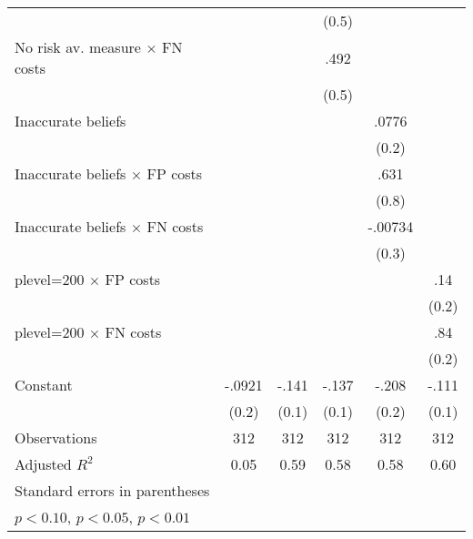 \begin{table}[htbp]
\begin{tabular}{l*{5}{c}}
                &                  &                  &    (0.5)         &                  &                  \\
No risk av. measure $\times$ FN costs&                  &                  &     .492         &                  &                  \\
                &                  &                  &    (0.5)         &                  &                  \\
Inaccurate beliefs&                  &                  &                  &    .0776         &                  \\
                &                  &                  &                  &    (0.2)         &                  \\
Inaccurate beliefs $\times$ FP costs&                  &                  &                  &     .631         &                  \\
                &                  &                  &                  &    (0.8)         &                  \\
Inaccurate beliefs $\times$ FN costs&                  &                  &                  &  -.00734         &                  \\
                &                  &                  &                  &    (0.3)         &                  \\
plevel=200 $\times$ FP costs&                  &                  &                  &                  &      .14         \\
                &                  &                  &                  &                  &    (0.2)         \\
plevel=200 $\times$ FN costs&                  &                  &                  &                  &      .84\sym{***}\\
                &                  &                  &                  &                  &    (0.2)         \\
Constant        &   -.0921         &    -.141\sym{*}  &    -.137         &    -.208         &    -.111         \\
                &    (0.2)         &    (0.1)         &    (0.1)         &    (0.2)         &    (0.1)         \\
\hline
Observations    &      312         &      312         &      312         &      312         &      312         \\
Adjusted \(R^{2}\)&     0.05         &     0.59         &     0.58         &     0.58         &     0.60         \\
\hline\hline
\multicolumn{6}{l}{\footnotesize Standard errors in parentheses}\\
\multicolumn{6}{l}{\footnotesize \sym{*} \(p<0.10\), \sym{**} \(p<0.05\), \sym{***} \(p<0.01\)}\\
\end{tabular}
\end{table}
